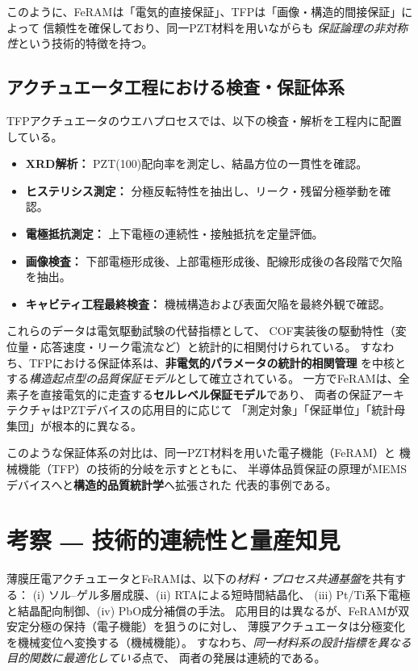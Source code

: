 \documentclass[conference]{IEEEtran}
\begin{document}
このように、FeRAMは「電気的直接保証」、TFPは「画像・構造的間接保証」によって
信頼性を確保しており、同一PZT材料を用いながらも
\emph{保証論理の非対称性}という技術的特徴を持つ。

\subsection{アクチュエータ工程における検査・保証体系}
TFPアクチュエータのウエハプロセスでは、以下の検査・解析を工程内に配置している。
\begin{itemize}
  \item \textbf{XRD解析：} PZT(100)配向率を測定し、結晶方位の一貫性を確認。
  \item \textbf{ヒステリシス測定：} 分極反転特性を抽出し、リーク・残留分極挙動を確認。
  \item \textbf{電極抵抗測定：} 上下電極の連続性・接触抵抗を定量評価。
  \item \textbf{画像検査：} 下部電極形成後、上部電極形成後、配線形成後の各段階で欠陥を抽出。
  \item \textbf{キャビティ工程最終検査：} 機械構造および表面欠陥を最終外観で確認。
\end{itemize}

これらのデータは電気駆動試験の代替指標として、
COF実装後の駆動特性（変位量・応答速度・リーク電流など）と統計的に相関付けられている。
すなわち、TFPにおける保証体系は、\textbf{非電気的パラメータの統計的相関管理}
を中核とする\emph{構造起点型の品質保証モデル}として確立されている。
一方でFeRAMは、全素子を直接電気的に走査する\textbf{セルレベル保証モデル}であり、
両者の保証アーキテクチャはPZTデバイスの応用目的に応じて
「測定対象」「保証単位」「統計母集団」が根本的に異なる。

\medskip
このような保証体系の対比は、同一PZT材料を用いた電子機能（FeRAM）と
機械機能（TFP）の技術的分岐を示すとともに、
半導体品質保証の原理がMEMSデバイスへと\textbf{構造的品質統計学}へ拡張された
代表的事例である。

\section{考察 ― 技術的連続性と量産知見}
薄膜圧電アクチュエータとFeRAMは、以下の\emph{材料・プロセス共通基盤}を共有する：
(i) ソル–ゲル多層成膜、(ii) RTAによる短時間結晶化、
(iii) Pt/Ti系下電極と結晶配向制御、(iv) PbO成分補償の手法\cite{bottaro1993solgel,scott2000review,damjanovic2010ferro}。
応用目的は異なるが、FeRAMが双安定分極の保持（電子機能）を狙うのに対し、
薄膜アクチュエータは分極変化を機械変位へ変換する（機械機能）。
すなわち、\emph{同一材料系の設計指標を異なる目的関数に最適化している}点で、
両者の発展は連続的である。
\end{document}

